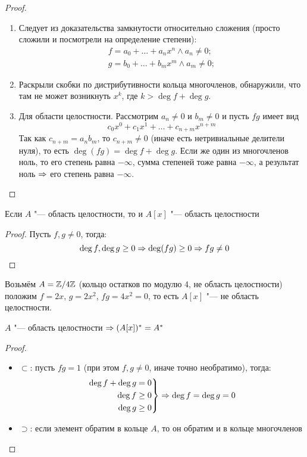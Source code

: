 \begin{proof}
	\begin{enumerate}
	\item Следует из доказательства замкнутости относительно сложения (просто сложили и посмотрели на определение степени):
	\begin{gather*}
	f = a_0 + \dots + a_nx^n \wedge a_n \neq 0;\\
	g = b_0 + \dots + b_mx^m \wedge a_m \neq 0;
	\end{gather*}
	\item Раскрыли скобки по дистрибутивности кольца многочленов, обнаружили, что там не может возникнуть
	      $x^k$, где $k > \deg f + \deg g$.
	\item Для области целостности. Рассмотрим $a_n\neq 0$ и $b_m \neq 0$ и пусть $fg$ имеет вид
	\[ c_0x^0 + c_1x^1 + \dots + c_{n+m}x^{n+m} \]
	Так как $c_{n+m}=a_nb_m$, то $c_{n+m} \neq 0$ (иначе есть нетривиальные делители нуля), то
	есть $\deg (fg) = \deg f + \deg g$.
	Если же один из многочленов ноль, то его степень равна $-\infty$, сумма степеней тоже равна
	$-\infty$, а результат ноль $\Rightarrow$ его степень равна $-\infty$.
	\end{enumerate}
\end{proof}	 

\begin{conseq}
	Если $A$ "--- область целостности, то и $A[x]$ "--- область целостности
\end{conseq}
\begin{proof}
	Пусть $f, g \neq 0$, тогда:
	\[
	\deg f, \deg g \geq 0
	\Rightarrow \deg (fg) \geq 0
	\Rightarrow  fg \neq 0	
	\]
\end{proof}
	 
\begin{exmp}
	Возьмём $A = \mathbb{Z} / 4 \mathbb{Z}$ (кольцо остатков по модулю 4, не область целостности)
	положим $f = 2x$, $g = 2x^2$, $fg = 4x^2 = 0$, то есть $A[x]$ "--- не область целостности.
\end{exmp} 
	 
\begin{conseq}
	$A$ "--- область целостности $\Rightarrow (A[x])^* = A^*$ 
\end{conseq}	 
\begin{proof}
\begin{itemize}
\item $\subset$: пусть $fg=1$ (при этом $f,g \neq 0$, иначе точно необратимо), тогда:
	\begin{equation*}
	\left.
		\begin{aligned}
		\deg f + \deg g &= 0 \\
		\deg f &\ge 0 \\
		\deg g &\ge 0
		\end{aligned}
	\right\} \Rightarrow \deg f = \deg g = 0
	\end{equation*}
\item $\supset$: если элемент обратим в кольце $A$, то он обратим и в кольце многочленов
\end{itemize}
\end{proof}
